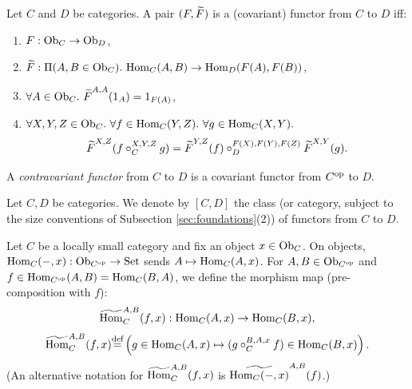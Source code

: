 \documentclass[10pt,a4paper]{article}
\begin{document}
\begin{definition}\label{def:functor}
Let $C$ and $D$ be categories. A pair $(F, {\widetilde{F}\textrm{}})$ is a (covariant) functor from $C$ to $D$ iff:
\begin{enumerate}
\item $F : {\textrm{Ob}}_C \to {\textrm{Ob}}_D$,
\item $\FMor : \Pi(A, B \in \Ob_C).\ \Hom_C(A,B) \to \Hom_D(F(A), F(B))$,
\item $\forall A\in \Ob_C.\ \FMor^{A,A}(1_A)=1_{F(A)}$,
\item $\forall X,Y,Z \in {\textrm{Ob}}_C.\ \forall f\in{\textrm{Hom}}_C(Y,Z).\ \forall g\in{\textrm{Hom}}_C(X,Y).$
$${\widetilde{F}\textrm{}}^{X,Z}(f\circ_C^{X,Y,Z} g)={\widetilde{F}\textrm{}}^{Y,Z}(f)\circ_D^{F(X),F(Y),F(Z)} {\widetilde{F}\textrm{}}^{X,Y}(g).$$
\end{enumerate}
A \emph{contravariant functor} from $C$ to $D$ is a covariant functor from $C^{\textrm{op}}$ to $D$.
\end{definition}

\begin{definition}
Let $C, D$ be categories. We denote by $[C,D]$ the class (or category, subject to the size conventions of Subsection \ref{sec:foundations}(2)) of functors from $C$ to $D$.
\end{definition}

\begin{definition}\label{def:hommor}
Let $C$ be a locally small category and fix an object $x \in {\textrm{Ob}}_C$. On objects, ${\textrm{Hom}}_C(-,x) : {\textrm{Ob}}_{C^{\textrm{op}}} \to {\textrm{Set}}$ sends $A \mapsto {\textrm{Hom}}_C(A,x)$.
For $A,B \in {\textrm{Ob}}_{C^{\textrm{op}}}$ and $f \in {\textrm{Hom}}_{C^{\textrm{op}}}(A,B) = {\textrm{Hom}}_C(B,A)$, we define the morphism map (pre-composition with $f$):
$${\widetilde{{\textrm{Hom}}}\textrm{}}^{A,B}_C(f,x) : {\textrm{Hom}}_C(A,x) \to {\textrm{Hom}}_C(B,x),$$
$${\widetilde{{\textrm{Hom}}}\textrm{}}^{A,B}_C(f,x) {\stackrel{{\textrm{def}}}{=}} \left(g \in {\textrm{Hom}}_C(A,x) \mapsto (g \circ_C^{B,A,x} f) \in {\textrm{Hom}}_C(B,x)\right).$$
(An alternative notation for ${\widetilde{{\textrm{Hom}}}\textrm{}}^{A,B}_C(f,x)$ is $\widetilde{{\textrm{Hom}}_C(-,x)}^{A,B}(f)$.)
\end{definition}
\end{document}
